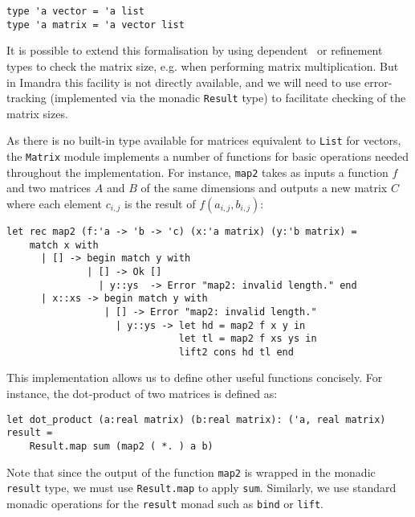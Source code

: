 \documentclass[runningheads]{llncs}
\begin{document}
\begin{lstlisting}[frame=none, language=caml]
type 'a vector = 'a list
type 'a matrix = 'a vector list 
\end{lstlisting}

It is possible to extend this formalisation by using dependent~\cite{heras_incidence_2011} or refinement~\cite{KokkeKKAA20} types to check the matrix size, e.g. when performing matrix multiplication. But in Imandra this facility is not directly available, and we will need to use error-tracking (implemented via the monadic \lstinline{Result} type) to facilitate checking of the matrix sizes.

As there is no built-in type available for matrices equivalent to \lstinline{List} for vectors, the \lstinline{Matrix} module implements a number of functions for basic operations needed throughout the implementation. For instance, \lstinline{map2} takes as inputs a function $f$ and two matrices $A$ and $B$ of the same dimensions and outputs a new matrix $C$ where each element $c_{i,j}$ is the result of $f(a_{i, j}, b_{i, j})$:

\begin{lstlisting}[frame=none, language=caml]
  let rec map2 (f:'a -> 'b -> 'c) (x:'a matrix) (y:'b matrix) =
    match x with
	  | [] -> begin match y with
   		      | [] -> Ok []
		        | y::ys  -> Error "map2: invalid length." end
 	  | x::xs -> begin match y with 
  		         | [] -> Error "map2: invalid length." 
		           | y::ys -> let hd = map2 f x y in
		                      let tl = map2 f xs ys in
		                      lift2 cons hd tl end
\end{lstlisting}

This implementation allows us to define other useful functions concisely. For instance, the dot-product of two matrices %
is defined as:

\begin{lstlisting}[frame=none, language=caml]
let dot_product (a:real matrix) (b:real matrix): ('a, real matrix) result =
	Result.map sum (map2 ( *. ) a b)
\end{lstlisting}

Note that since the output of the function \lstinline{map2} is wrapped in the monadic \lstinline{result} type, we must use \lstinline{Result.map} to apply \lstinline|sum|. Similarly, we use standard monadic operations for the \lstinline|result| monad such as \lstinline|bind| or \lstinline|lift|.
\end{document}
